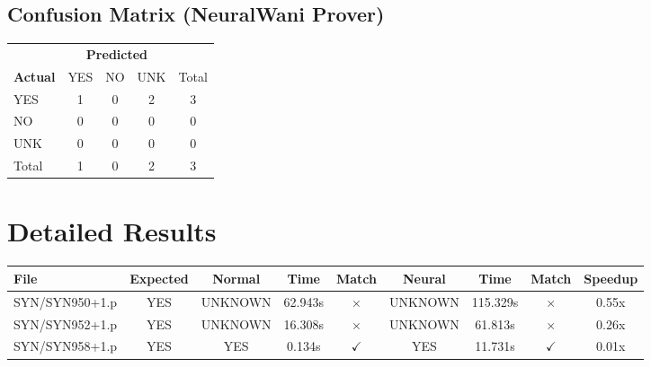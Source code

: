 \documentclass[a4paper,10pt]{article}
\begin{document}
\subsection{Confusion Matrix (NeuralWani Prover)}

\begin{tabular}{l|ccc|c}
\toprule
 & \multicolumn{3}{c|}{\textbf{Predicted}} & \\
\textbf{Actual} & YES & NO & UNK & Total \\
\midrule
YES & 1 & 0 & 2 & 3 \\
NO & 0 & 0 & 0 & 0 \\
UNK & 0 & 0 & 0 & 0 \\
\midrule
Total & 1 & 0 & 2 & 3 \\
\bottomrule
\end{tabular}



\section{Detailed Results}

\begin{longtable}{lcccccccc}
\toprule
\textbf{File} & \textbf{Expected} & \textbf{Normal} & \textbf{Time} & \textbf{Match} & \textbf{Neural} & \textbf{Time} & \textbf{Match} & \textbf{Speedup} \\
\midrule
\endhead
SYN/SYN950+1.p & YES & UNKNOWN & 62.943s & \cellcolor{mismatchcolor}$\times$ & UNKNOWN & 115.329s & \cellcolor{mismatchcolor}$\times$ & 0.55x \\
SYN/SYN952+1.p & YES & UNKNOWN & 16.308s & \cellcolor{mismatchcolor}$\times$ & UNKNOWN & 61.813s & \cellcolor{mismatchcolor}$\times$ & 0.26x \\
SYN/SYN958+1.p & YES & YES & 0.134s & \cellcolor{matchcolor}$\checkmark$ & YES & 11.731s & \cellcolor{matchcolor}$\checkmark$ & 0.01x \\
\bottomrule
\end{longtable}
\end{document}
